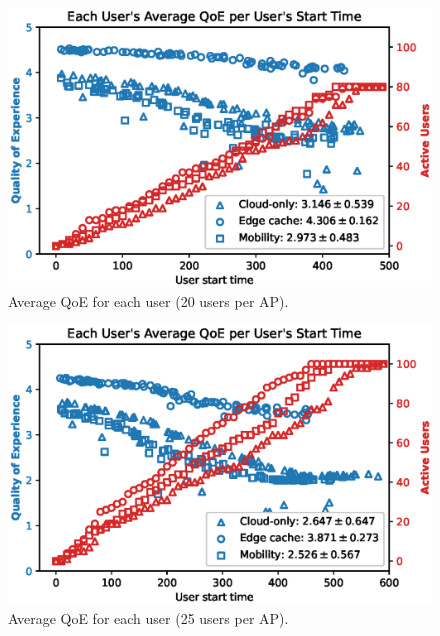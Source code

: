 \begin{figure}[!htb]
    \centering
    \includegraphics[width=\linewidth]{images/UserQoExUserStartTime20users.eps}
    \vspace{-0.5cm}
    \caption{Average QoE for each user (20 users per AP).}
    \label{fig:exp-setup-20}
\end{figure}

\begin{figure}[!htb]
    \centering
    \includegraphics[width=\linewidth]{images/UserQoExUserStartTime25users.eps}
    \vspace{-0.5cm}
    \caption{Average QoE for each user (25 users per AP).}
    \label{fig:exp-setup-25}
\end{figure}

